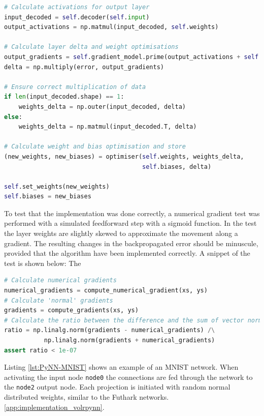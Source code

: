 \begin{lstlisting}[language=Python,label={lst:volrpynn_backprop},caption={Part
of the backpropagation algorithm implemented in PyNN.}]
# Calculate activations for output layer
input_decoded = self.decoder(self.input)
output_activations = np.matmul(input_decoded, self.weights)

# Calculate layer delta and weight optimisations
output_gradients = self.gradient_model.prime(output_activations + self.biases)
delta = np.multiply(error, output_gradients)

# Ensure correct multiplication of data
if len(input_decoded.shape) == 1:
    weights_delta = np.outer(input_decoded, delta)
else:
    weights_delta = np.matmul(input_decoded.T, delta)

# Calculate weight and bias optimisation and store
(new_weights, new_biases) = optimiser(self.weights, weights_delta,
                                      self.biases, delta)

self.set_weights(new_weights)
self.biases = new_biases
\end{lstlisting}

To test that the implementation was done correctly, a numerical gradient test
was performed with a simulated feedforward step with a sigmoid function.
In the test the layer weights are slightly skewed to approximate the movement
along a gradient.
The resulting changes in the backpropagated error should be minuscule, provided
that the algorithm have been implemented correctly.
A snippet of the test is shown below:
The

\begin{minipage}{\linewidth}
\begin{lstlisting}[language=Python,label={lst:volrpynn_numerical},caption={Part
of the numerical gradient test for the densely connected layer in PyNN.}]
# Calculate numerical gradients
numerical_gradients = compute_numerical_gradient(xs, ys)
# Calculate 'normal' gradients
gradients = compute_gradients(xs, ys)
# Calculate the ratio between the difference and the sum of vector norms
ratio = np.linalg.norm(gradients - numerical_gradients) /\
           np.linalg.norm(gradients + numerical_gradients)
assert ratio < 1e-07
\end{lstlisting}
\end{minipage}

Listing \ref{lst:PyNN-MNIST} shows an example of an MNIST network.
When activating the input node \texttt{node0} the connections are fed through
the network to the \texttt{node2} output node.
Each projection is initiated with random normal distributed weights, similar
to the Futhark networks.
\ref{app:implementation_volrpynn}.

